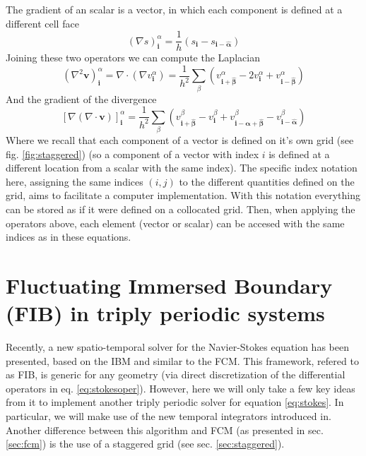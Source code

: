 \documentclass[ twoside,openright,titlepage,numbers=noenddot,%
headinclude,footinclude,cleardoublepage=empty,abstract=on,
BCOR=5mm,paper=a4,fontsize=11pt, dvipsnames
]{scrreprt}
\renewcommand{\vec}[1]{\bm{#1}}
\begin{document}
The gradient of an scalar is a vector, in which each component is defined at a different cell face
\begin{equation}
  \label{eq:staggeredgrad}
  (\nabla s)^\alpha_{\vec{i}} = \frac{1}{h}(s_{\vec{i}} - s_{\vec{i}- \vec{\hat{\alpha}}})
\end{equation}
Joining these two operators we can compute the Laplacian
\begin{equation}
  (\nabla^2\vec{v})^\alpha_{\vec{i}} = \nabla\cdot(\nabla v_{\vec{i}}^\alpha) = \frac{1}{h^2}\sum_\beta\left(v^\alpha_{\vec{i} +\vec{\hat{\beta}}}  - 2v^\alpha_{\vec{i}} + v^\alpha_{\vec{i} -\vec{\hat{\beta}}} \right)
\end{equation}
And the gradient of the divergence
\begin{equation}
  \label{eq:staggeredlap}
\left[\nabla(\nabla\cdot \vec{v})\right]^\alpha_{\vec{i}} = \frac{1}{h^2}\sum_\beta\left(v^\beta_{\vec{i} +\vec{\hat{\beta}}}  - v^\beta_{\vec{i}} + v^\beta_{\vec{i} -\vec{\hat{\alpha}} + \vec{\hat{\beta}}} - v^\beta_{\vec{i} -\vec{\hat{\alpha}}}\right)
\end{equation}
Where we recall that each component of a vector is defined on it's own grid (see fig. \ref{fig:staggered}) (so a component of a vector with index $i$ is defined at a different location from a scalar with the same index). The specific index notation here, assigning the same indices $(i,j)$ to the different quantities defined on the grid, aims to facilitate a computer implementation. With this notation everything can be stored as if it were defined on a collocated grid. Then, when applying the operators above, each element (vector or scalar) can be accesed with the same indices as in these equations.



\section{Fluctuating Immersed Boundary (FIB) in triply periodic systems}\label{sec:fib}
Recently, a new spatio-temporal solver for the Navier-Stokes equation has been presented, based on the \gls{IBM} and similar to the \gls{FCM}\cite{Delong2014}. This framework, refered to as \gls{FIB}, is generic for any geometry (via direct discretization of the differential operators in eq. \eqref{eq:stokesoper}). However, here we will only take a few key ideas from it to implement another triply periodic solver for equation \eqref{eq:stokes}. In particular, we will make use of the new temporal integrators introduced in\cite{Delong2014}. Another difference between this algorithm and \gls{FCM} (as presented in sec. \ref{sec:fcm}) is the use of a staggered grid (see sec. \ref{sec:staggered}).
\end{document}
